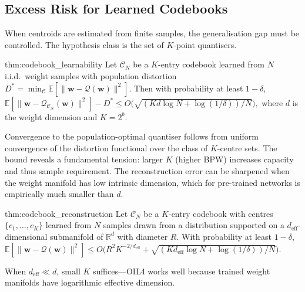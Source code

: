 \subsection{Excess Risk for Learned Codebooks}
When centroids are estimated from finite samples, the generalisation gap
must be controlled. The hypothesis class is the set of $K$-point quantisers.
\begin{mythm}{thm:codebook_learnability}
Let $\mathcal{C}_N$ be a $K$-entry codebook learned from $N$ i.i.d.\ weight
samples with population distortion $D^* = \min_{\mathcal{C}} \mathbb{E}[ \|
\mathbf{w} - \mathcal{Q}(\mathbf{w}) \|^2 ]$. Then with probability at least
$1 - \delta$,
$\mathbb{E}[\| \mathbf{w} - \mathcal{Q}_{\mathcal{C}_N}(\mathbf{w}) \|^2] -
D^* \leq O\big( \sqrt{ (K d \log N + \log(1/\delta))/N } \big),$
where $d$ is the weight dimension and $K = 2^b$.
\end{mythm}
Convergence to the population-optimal quantiser follows from uniform
convergence of the distortion functional over the class of $K$-centre sets.
The bound reveals a fundamental tension: larger $K$ (higher BPW) increases
capacity and thus sample requirement. The reconstruction error can be
sharpened when the weight manifold has low intrinsic dimension, which for
pre-trained networks is empirically much smaller than $d$.
\begin{mythm}{thm:codebook_reconstruction}
Let $\mathcal{C}_N$ be a $K$-entry codebook with centres $\{c_1, \dots,
c_K\}$ learned from $N$ samples drawn from a distribution supported on a
$d_{\text{eff}}$-dimensional submanifold of $\mathbb{R}^d$ with diameter
$R$. With probability at least $1 - \delta$,
$\mathbb{E}[\| \mathbf{w} - \mathcal{Q}(\mathbf{w}) \|^2] \leq
O\big( R^2 K^{-2/d_{\text{eff}}} + \sqrt{ (K d_{\text{eff}} \log N +
\log(1/\delta))/N } \big).$
\end{mythm}
When $d_{\text{eff}} \ll d$, small $K$ suffices---OIL4 works well because
trained weight manifolds have logarithmic effective dimension.

